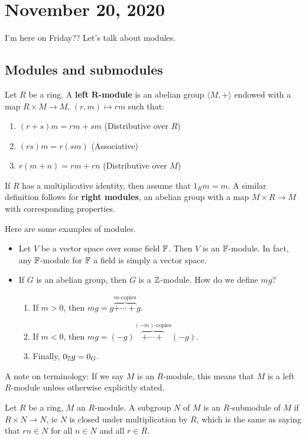 \section{November 20, 2020}
I'm here on Friday?? Let's talk about modules.
\subsection{Modules and submodules}
\begin{definition}[Modules]
    Let $R$ be a ring. A \textbf{left} $\mathbf{R}$\textbf{-module} is an abelian group $\langle M,+ \rangle $ endowed with a map $R\times M\to M,\, (r,m)\mapsto rm$ such that:
    \begin{enumerate}[label=\arabic*)]
        \item $\left( r+s \right) m=rm+sm$ (Distributive over $R$)
        \item $(rs)m=r(sm)$ (Associative)
        \item $r(m+n)=rm+rn$ (Distributive over $M$)
    \end{enumerate}
    If $R$ has a multiplicative identity, then assume that $1_Rm=m$. A similar definition follows for \textbf{right modules}, an abelian group with a map $M\times R\to M$ with corresponding properties.
\end{definition}
\begin{example}
    Here are some examples of modules.
    \begin{itemize}
        \item Let $V$ be a vector space over some field $\mathbb{F}$. Then $V$ is an $\mathbb{F}$-module. In fact, any $\mathbb{F}$-module for $\mathbb{F}$ a field is simply a vector space.
        \item If $G$ is an abelian group, then $G$ is a $\mathbb{Z}$-module. How do we define $mg$?
            \begin{enumerate}
                \item If $m>0$, then $mg=g\overset{m \text{-copies} }{\overbrace{+\cdots +}} g$. 
                \item If $m<0$, then $mg=(-g)\overset{(-m)  \text{-copies} }{\overbrace{+\cdots +}} (-g)$. 
                \item Finally, $0_{\mathbb{Z}}g=0_G$.
            \end{enumerate}
    \end{itemize}
\end{example}
\begin{note}
    A note on terminology: If we say $M$ is an $R$-module, this means that $M$ is a left $R$-module unless otherwise explicitly stated. 
\end{note}
\begin{definition}[Submodules]
    Let $R$ be a ring, $M$ an $R$-module. A subgroup $N$ of $M$ is an $R$-submodule of $M$ if $R\times N\to N$, ie $N$ is closed under multiplication by $R$, which is the same as saying that $rn\in N$ for all $n\in N$ and all $r\in R$.
\end{definition}
